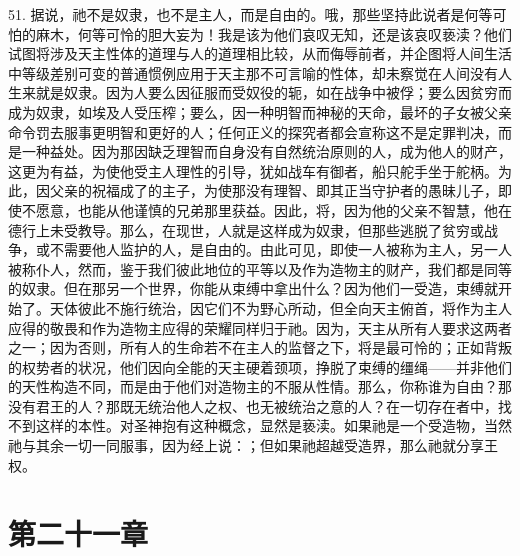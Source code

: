 51. 据说，祂不是奴隶，也不是主人，而是自由的。哦，那些坚持此说者是何等可怕的麻木，何等可怜的胆大妄为！我是该为他们哀叹无知，还是该哀叹亵渎？他们试图将涉及天主性体的道理与人的道理相比较，从而侮辱前者，并企图将人间生活中等级差别可变的普通惯例应用于天主那不可言喻的性体，却未察觉在人间没有人生来就是奴隶。因为人要么因征服而受奴役的轭，如在战争中被俘；要么因贫穷而成为奴隶，如埃及人受压榨；要么，因一种明智而神秘的天命，最坏的子女被父亲命令罚去服事更明智和更好的人；任何正义的探究者都会宣称这不是定罪判决，而是一种益处。因为那因缺乏理智而自身没有自然统治原则的人，成为他人的财产，这更为有益，为使他受主人理性的引导，犹如战车有御者，船只舵手坐于舵柄。为此，因父亲的祝福成了的主子，为使那没有理智、即其正当守护者的愚昧儿子，即使不愿意，也能从他谨慎的兄弟那里获益。因此，将，因为他的父亲不智慧，他在德行上未受教导。那么，在现世，人就是这样成为奴隶，但那些逃脱了贫穷或战争，或不需要他人监护的人，是自由的。由此可见，即使一人被称为主人，另一人被称仆人，然而，鉴于我们彼此地位的平等以及作为造物主的财产，我们都是同等的奴隶。但在那另一个世界，你能从束缚中拿出什么？因为他们一受造，束缚就开始了。天体彼此不施行统治，因它们不为野心所动，但全向天主俯首，将作为主人应得的敬畏和作为造物主应得的荣耀同样归于祂。因为，天主从所有人要求这两者之一；因为否则，所有人的生命若不在主人的监督之下，将是最可怜的；正如背叛的权势者的状况，他们因向全能的天主硬着颈项，挣脱了束缚的缰绳——并非他们的天性构造不同，而是由于他们对造物主的不服从性情。那么，你称谁为自由？那没有君王的人？那既无统治他人之权、也无被统治之意的人？在一切存在者中，找不到这样的本性。对圣神抱有这种概念，显然是亵渎。如果祂是一个受造物，当然祂与其余一切一同服事，因为经上说：；但如果祂超越受造界，那么祂就分享王权。\par


\section{第二十一章}

\par

